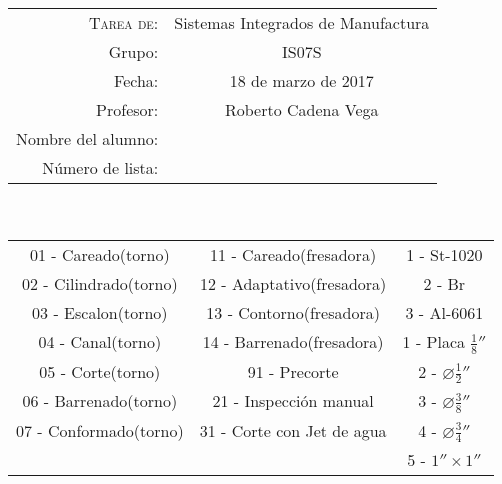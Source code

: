 



\title{\normalfont \normalsize \vspace{-6ex}
\begin{center}
	\begin{tabular}{r c}
		\textsc{Tarea de:} & Sistemas Integrados de Manufactura \\
		Grupo: & IS07S \\
		Fecha: & 18 de marzo de 2017 \\
		Profesor: & Roberto Cadena Vega \\
		Nombre del alumno: & \underline{\hspace{11cm}} \\
		Número de lista: & \underline{\hspace{2.5cm}}
	\end{tabular}
\end{center}
}

\date{}
\author{}




\maketitle %

\begin{center}
\end{center}

		\begin{center}
			\begin{tabular}{|c|c|c|}
				01 - Careado(torno)    & 11 - Careado(fresadora)    & 1 - St-1020\\
				02 - Cilindrado(torno) & 12 - Adaptativo(fresadora) & 2 - Br \\
				03 - Escalon(torno)    & 13 - Contorno(fresadora)   & 3 - Al-6061\\
				04 - Canal(torno)      & 14 - Barrenado(fresadora)  & 1 - Placa $\frac{1}{8}''$ \\
				05 - Corte(torno)      & 91 - Precorte              & 2 - $\diameter \frac{1}{2}''$ \\
				06 - Barrenado(torno)  & 21 - Inspección manual     & 3 - $\diameter \frac{3}{8}''$ \\
				07 - Conformado(torno) & 31 - Corte con Jet de agua & 4 - $\diameter \frac{3}{4}''$ \\
				 & & 5 - $1'' \times 1''$
			\end{tabular}
		\end{center}


